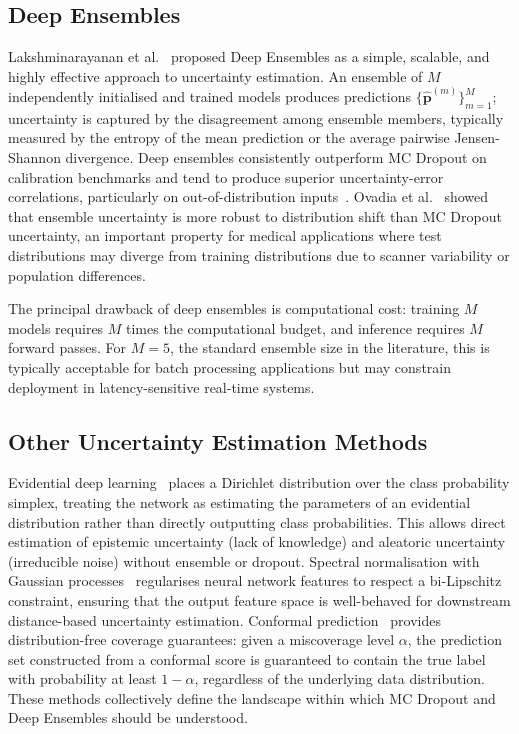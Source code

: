 \subsection{Deep Ensembles}

Lakshminarayanan et al.~\cite{lakshminarayanan2017simple} proposed Deep Ensembles as a simple, scalable, and highly effective approach to uncertainty estimation. An ensemble of $M$ independently initialised and trained models produces predictions $\{\hat{\mathbf{p}}^{(m)}\}_{m=1}^M$; uncertainty is captured by the disagreement among ensemble members, typically measured by the entropy of the mean prediction or the average pairwise Jensen-Shannon divergence. Deep ensembles consistently outperform MC Dropout on calibration benchmarks and tend to produce superior uncertainty-error correlations, particularly on out-of-distribution inputs~\cite{ovadia2019can}. Ovadia et al.~\cite{ovadia2019can} showed that ensemble uncertainty is more robust to distribution shift than MC Dropout uncertainty, an important property for medical applications where test distributions may diverge from training distributions due to scanner variability or population differences.

The principal drawback of deep ensembles is computational cost: training $M$ models requires $M$ times the computational budget, and inference requires $M$ forward passes. For $M=5$, the standard ensemble size in the literature, this is typically acceptable for batch processing applications but may constrain deployment in latency-sensitive real-time systems.

\subsection{Other Uncertainty Estimation Methods}

Evidential deep learning~\cite{sensoy2018evidential} places a Dirichlet distribution over the class probability simplex, treating the network as estimating the parameters of an evidential distribution rather than directly outputting class probabilities. This allows direct estimation of epistemic uncertainty (lack of knowledge) and aleatoric uncertainty (irreducible noise) without ensemble or dropout. Spectral normalisation with Gaussian processes~\cite{liu2020simple} regularises neural network features to respect a bi-Lipschitz constraint, ensuring that the output feature space is well-behaved for downstream distance-based uncertainty estimation. Conformal prediction~\cite{angelopoulos2021gentle} provides distribution-free coverage guarantees: given a miscoverage level $\alpha$, the prediction set constructed from a conformal score is guaranteed to contain the true label with probability at least $1-\alpha$, regardless of the underlying data distribution. These methods collectively define the landscape within which MC Dropout and Deep Ensembles should be understood.

